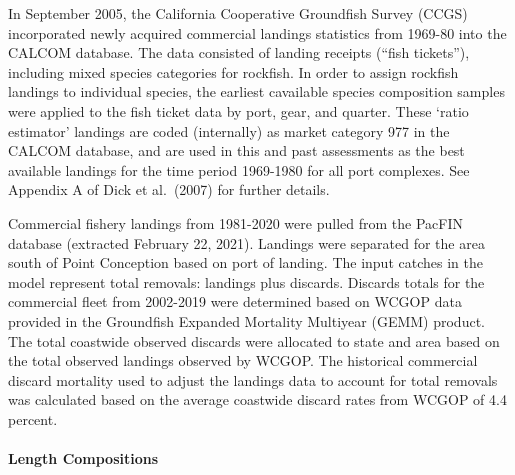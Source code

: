 \documentclass[11pt,
  english,
  a4paper,
]{article}
\begin{document}

In September 2005, the California Cooperative Groundfish Survey (CCGS) incorporated newly acquired commercial landings statistics from 1969-80 into the CALCOM database. The data consisted of landing receipts (``fish tickets''), including mixed species categories for rockfish. In order to assign rockfish landings to individual species, the earliest cavailable species composition samples were applied to the fish ticket data by port, gear, and quarter. These `ratio estimator' landings are coded (internally) as market category 977 in the CALCOM database, and are used in this and past assessments as the best available landings for the time period 1969-1980 for all port complexes. See Appendix A of Dick et al.~{(2007)\leavevmode\tagmcend\tagstructend} for further details.

\leavevmode\tagmcend\tagstructend\par


Commercial fishery landings from 1981-2020 were pulled from the PacFIN database (extracted February 22, 2021). Landings were separated for the area south of Point Conception based on port of landing. The input catches in the model represent total removals: landings plus discards. Discards totals for the commercial fleet from 2002-2019 were determined based on WCGOP data provided in the Groundfish Expanded Mortality Multiyear (GEMM) product. The total coastwide observed discards were allocated to state and area based on the total observed landings observed by WCGOP. The historical commercial discard mortality used to adjust the landings data to account for total removals was calculated based on the average coastwide discard rates from WCGOP of 4.4 percent.

\leavevmode\tagmcend\tagstructend\par


\hypertarget{length-compositions}{%
\paragraph{Length Compositions}\label{length-compositions}}

\leavevmode\tagmcend\tagstructend

\end{document}
